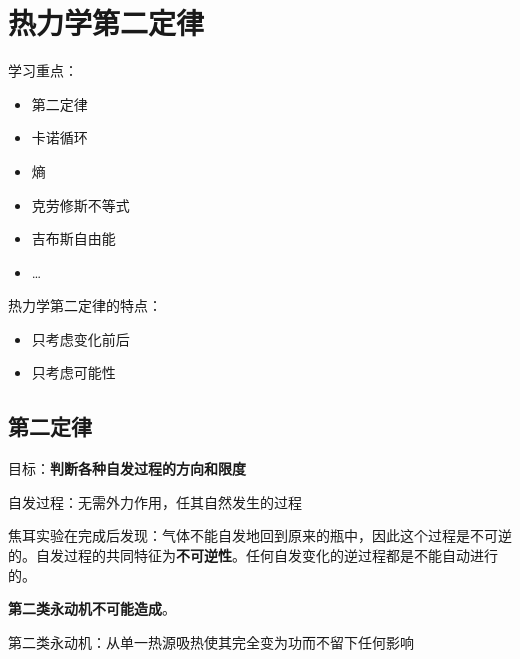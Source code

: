 \section{热力学第二定律}%
\label{sec:热力学第二定律}
学习重点：
\begin{itemize}
    \item 第二定律
    \item 卡诺循环
    \item 熵
    \item 克劳修斯不等式
    \item 吉布斯自由能
    \item \ldots 
    
\end{itemize}
\begin{notation}
    热力学第二定律的特点：
    \begin{itemize}
        \item 只考虑变化前后
        \item 只考虑可能性
        
    \end{itemize}
\end{notation}
\subsection{第二定律}%
\label{sub:第二定律}
目标：\textbf{判断各种自发过程的方向和限度}
\begin{defi}
    自发过程：无需外力作用，任其自然发生的过程
\end{defi}
焦耳实验在完成后发现：气体不能自发地回到原来的瓶中，因此这个过程是不可逆的。自发过程的共同特征为\textbf{不可逆性}。任何自发变化的逆过程都是不能自动进行的。
\begin{notation}
\textbf{第二类永动机不可能造成}。

第二类永动机：从单一热源吸热使其完全变为功而不留下任何影响
\end{notation}

